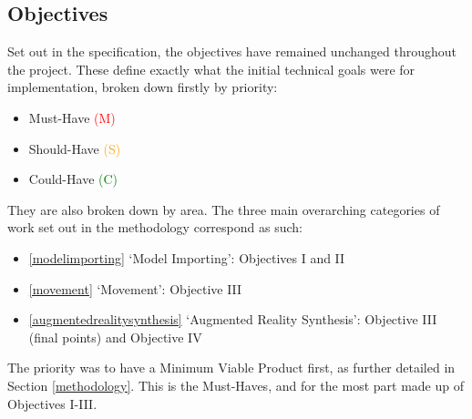 \documentclass[12pt, a4paper]{article}
\newcommand{\must}[1]{\textcolor{red}{#1}}
\newcommand{\should}[1]{\textcolor{orange}{#1}}
\newcommand{\could}[1]{\textcolor{green}{#1}}
\begin{document}
\subsection{Objectives}
\label{Objectives}
Set out in the specification, the objectives have remained unchanged throughout the project. These define exactly what the initial technical goals were for implementation, broken down firstly by priority: 
\begin{itemize}
    \item Must-Have \must{(M)}
    \item Should-Have \should{(S)}
    \item Could-Have \could{(C)}
\end{itemize}

They are also broken down by area. The three main overarching categories of work set out in the methodology correspond as such:
\begin{itemize}
    \item \ref{modelimporting} `Model Importing': Objectives I and II 
    \item \ref{movement} `Movement': Objective III 
    \item \ref{augmentedrealitysynthesis} `Augmented Reality Synthesis': Objective III (final points) and Objective IV 
\end{itemize}

The priority was to have a Minimum Viable Product first, as further detailed in Section \ref{methodology}. This is the Must-Haves, and for the most part made up of Objectives I-III.
\end{document}
